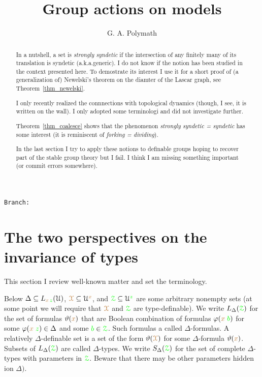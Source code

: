 \documentclass[10pt,openany]{amsproc}
\def\X{\EuScript X}
\def\Z{\EuScript Z}
\def\U{\EuScript U}
\def\theta{\vartheta}
\def\phi{\varphi}
\newcounter{thm}
\theoremstyle{mio}
\def\mr{\color{brown}}
\def\gr{\color{green}}
\def\mrX{{\mr\X}}
\def\grZ{{\gr\Z}}
\newcommand\branch{}
\begin{document}
\author{G. A. Polymath}
\title{Group actions on models}
\hfill\texttt{Branch:\ \branch\ \DTMnow}
\maketitle
\raggedbottom
\begin{abstract}
  \setlength{\parindent}{0ex}
  \setlength{\parskip}{.4\baselineskip}
  In a nutshell, a set is \textit{strongly syndetic\/} if the intersection of any finitely many of its translation is syndetic (a.k.a.\@ generic). 
  I do not know if the notion has been studied in the context presented here. To demostrate its interest I use it for a short proof of (a generalization of) Newelski's theorem on the diamter of the Lascar graph, see Theorem~\ref{thm_newelski}.

  I only recently realized the connnections with topological dynamics (though, I see, it is written on the wall). I only adopted some terminologi and did not investigate further.
  
  Theorem~\ref{thm_coalesce} shows that the phenomenon \textit{strongly syndetic = syndetic\/} has some interest (it is reminiscent of \textit{forking = dividing\/}).

  In the last section I try to apply these notions to definable groups hoping to recover part of the stable group theory but I fail.
  I think I am missing something important (or commit errors somewhere).
\end{abstract}

\def\medrel#1{\parbox[t]{5ex}{$\displaystyle\hfil #1$}}
\def\ceq#1#2#3{\parbox[t]{17ex}{$\displaystyle #1$}\medrel{#2}{$\displaystyle #3$}}

\section{The two perspectives on the invariance of types}

This section I review well-known matter and set the terminology.

Below $\Delta\subseteq L_{{\mr x}\,{\gr z}}(\U)$, ${\mrX}\subseteq\U^{\mr x}$, and ${\grZ}\subseteq\U^{\gr z}$ are some arbitrary nonempty sets (at some point we will require that $\mrX$ and $\grZ$ are type-definable).
We write $L_\Delta({\grZ})$ for the set of formulas $\theta({\mr x})$ that are Boolean combination of formulas $\phi({\mr x}\;{\gr b})$ for some $\phi({\mr x}\;{\gr z})\in\Delta$ and some ${\gr b}\in{\grZ}$.
Such formulas a called $\Delta$-formulas.
A relatively $\Delta$-definable set is a set of the form $\theta(\mrX)$ for some $\Delta$-formula $\theta({\mr x})$.
Subsets of $L_\Delta({\grZ})$ are called $\Delta$-types.
We write $S_\Delta({\grZ})$ for the set of complete $\Delta$-types with parameters in $\grZ$. Beware that there may be other parameters hidden ion $\Delta)$.
\end{document}
